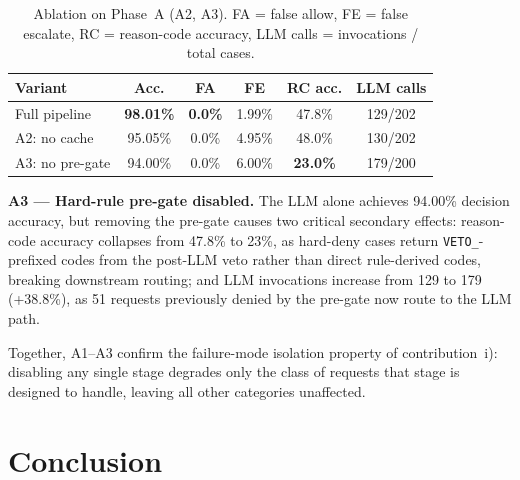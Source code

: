 \documentclass[runningheads]{llncs}
\begin{document}
\begin{table}[t]
\caption{Ablation on Phase~A (A2, A3). FA = false allow, FE = false escalate,
RC = reason-code accuracy, LLM calls = invocations / total cases.}
\label{tab:ablation}
\centering
\renewcommand{\arraystretch}{1}
\setlength{\tabcolsep}{5pt}
\begin{tabular}{lccccc}
\toprule
Variant & Acc. & FA & FE & RC acc. & LLM calls \\
\midrule
Full pipeline   & \textbf{98.01\%} & \textbf{0.0\%} & 1.99\% & 47.8\% & 129/202 \\
A2: no cache    & 95.05\% & 0.0\% & 4.95\% & 48.0\% & 130/202 \\
A3: no pre-gate & 94.00\% & 0.0\% & 6.00\% & \textbf{23.0\%} & 179/200 \\
\bottomrule
\end{tabular}
\end{table}

\noindent\textbf{A3 --- Hard-rule pre-gate disabled.} The LLM alone achieves 94.00\% decision accuracy, but removing the pre-gate causes two critical secondary effects: reason-code accuracy collapses from 47.8\% to 23\%, as hard-deny cases return \texttt{VETO\_}-prefixed codes from the post-LLM veto rather than direct rule-derived codes, breaking downstream routing; and LLM invocations increase from 129 to 179 (+38.8\%), as 51 requests previously denied by the pre-gate now route to the LLM path.

Together, A1--A3 confirm the failure-mode isolation property of contribution~i): disabling any single stage degrades only the class of requests that stage is designed to handle, leaving all other categories unaffected.

\section{Conclusion}
\end{document}
